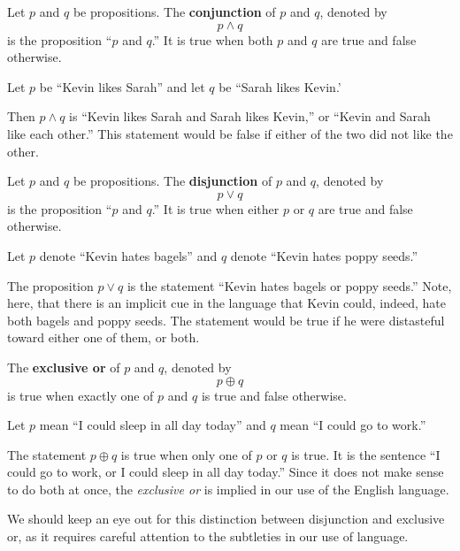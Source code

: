   Let \(p\) and \(q\) be propositions. The \textbf{conjunction} of \(p\) and \(q\), denoted by \[ p \wedge q \] is the proposition
  ``\(p\) and \(q\).'' It is true when both \(p\) and \(q\) are true and false otherwise.
  \begin{ex}
    Let $p$ be ``Kevin likes Sarah'' and let $q$ be ``Sarah likes Kevin.'

    Then $p \wedge q$ is ``Kevin likes Sarah and Sarah likes Kevin,'' or ``Kevin and Sarah like each other.''
    This statement would be false if either of the two did not like the other.
  \end{ex}

  Let \(p\) and \(q\) be propositions. The \textbf{disjunction} of \(p\) and \(q\), denoted by \[ p \vee q \] is the proposition
  ``\(p\) and \(q\).'' It is true when either \(p\) or \(q\) are true and false otherwise.
  \begin{ex}
    Let $p$ denote ``Kevin hates bagels'' and $q$ denote ``Kevin hates poppy seeds.''

    The proposition $p \vee q$ is the statement ``Kevin hates bagels or poppy seeds.''
    Note, here, that there is an implicit cue in the language that Kevin could, indeed, hate both bagels and poppy seeds.
    The statement would be true if he were distasteful toward either one of them, or both.
  \end{ex}

  The \textbf{exclusive or} of \(p\) and \(q\), denoted by \[p \oplus q\] is true when exactly one of \(p\) and \(q\) is true and false otherwise.
  \begin{ex}
    Let $p$ mean ``I could sleep in all day today'' and $q$ mean ``I could go to work.''

    The statement $p \oplus q$ is true when only one of $p$ or $q$ is true.
    It is the sentence ``I could go to work, or I could sleep in all day today.''
    Since it does not make sense to do both at once, the \emph{exclusive or} is implied in our use of the English language.

    We should keep an eye out for this distinction between disjunction and exclusive or, as it requires careful
    attention to the subtleties in our use of language.
  \end{ex}

